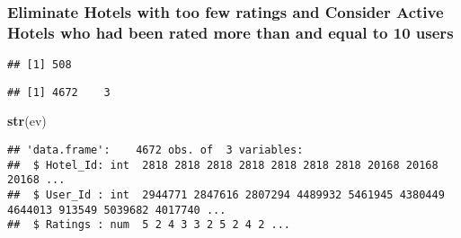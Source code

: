 \documentclass[]{article}
\newenvironment{Shaded}{\begin{snugshade}}{\end{snugshade}}
\newcommand{\DataTypeTok}[1]{\textcolor[rgb]{0.13,0.29,0.53}{#1}}
\newcommand{\DecValTok}[1]{\textcolor[rgb]{0.00,0.00,0.81}{#1}}
\newcommand{\KeywordTok}[1]{\textcolor[rgb]{0.13,0.29,0.53}{\textbf{#1}}}
\newcommand{\NormalTok}[1]{#1}
\newcommand{\OperatorTok}[1]{\textcolor[rgb]{0.81,0.36,0.00}{\textbf{#1}}}
\newcommand{\StringTok}[1]{\textcolor[rgb]{0.31,0.60,0.02}{#1}}
\begin{document}
\hypertarget{eliminate-hotels-with-too-few-ratings-and-consider-active-hotels-who-had-been-rated-more-than-and-equal-to-10-users}{%
\subsubsection{Eliminate Hotels with too few ratings and Consider Active
Hotels who had been rated more than and equal to 10
users}\label{eliminate-hotels-with-too-few-ratings-and-consider-active-hotels-who-had-been-rated-more-than-and-equal-to-10-users}}

\begin{Shaded}
\end{Shaded}

\begin{verbatim}
## [1] 508
\end{verbatim}

\begin{Shaded}
\end{Shaded}

\begin{verbatim}
## [1] 4672    3
\end{verbatim}

\begin{Shaded}
\begin{Highlighting}[]
\KeywordTok{str}\NormalTok{(ev)}
\end{Highlighting}
\end{Shaded}

\begin{verbatim}
## 'data.frame':    4672 obs. of  3 variables:
##  $ Hotel_Id: int  2818 2818 2818 2818 2818 2818 2818 20168 20168 20168 ...
##  $ User_Id : int  2944771 2847616 2807294 4489932 5461945 4380449 4644013 913549 5039682 4017740 ...
##  $ Ratings : num  5 2 4 3 3 2 5 2 4 2 ...
\end{verbatim}
\end{document}
